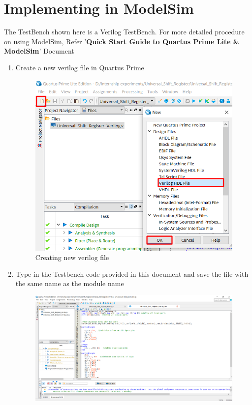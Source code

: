 \documentclass[12pt]{article}
\begin{document}
\section{Implementing in ModelSim}
The TestBench shown here is a Verilog TestBench. For more detailed procedure on using ModelSim, Refer '\textbf{Quick Start Guide to Quartus Prime Lite & ModelSim}' Document
\begin{enumerate}
    \item Create a new verilog file in Quartus Prime
    \begin{figure}[H]
        \centering
        \includegraphics[scale=0.4]{usr9.png}
        \caption{Creating new verilog file}
    \end{figure}
    \item Type in the Testbench code provided in this document and save the file with the same name as the module name
     \begin{figure}[H]
        \centering
        \includegraphics[scale=0.3]{usr10.png}

\end{figure}
\end{enumerate}
\end{document}
